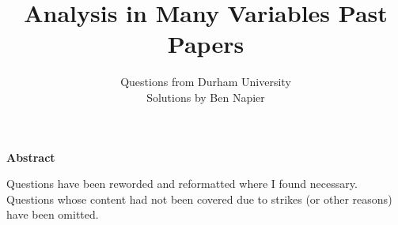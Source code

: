 \documentclass[a4paper, answers]{exam}
\title{Analysis in Many Variables Past Papers}
\author{
    Questions from Durham University \\ 
    Solutions by Ben Napier
}
\begin{document}
    \begin{titlepage}
        \maketitle
    \end{titlepage}

    \tableofcontents
    \clearpage

    \thispagestyle{empty}
    \vspace*{21.5em}
    \begin{center}
        \parbox{0.77\textwidth}{
            \noindent
            \begin{center}
                \normalsize\textbf{Abstract}
            \end{center}
            \vspace{-3pt}
            Questions have been reworded and reformatted where
            I found necessary.
            Questions whose content had not been covered due
            to strikes (or other reasons) have been omitted.
        }
    \end{center}
    \vspace*{\fill}

    \clearpage
    \begin{questions}
        
    \end{questions}
\end{document}
